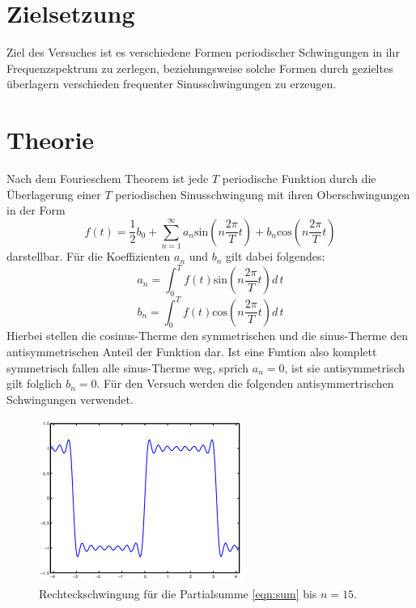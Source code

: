 \section{Zielsetzung}
\label{sec:Zielsetzung}
Ziel des Versuches ist es verschiedene Formen periodischer Schwingungen
in ihr Frequenzspektrum zu zerlegen, beziehungsweise solche Formen
durch gezieltes überlagern verschieden frequenter Sinusschwingungen
zu erzeugen.

\section{Theorie}
\label{sec:Theorie}
Nach dem Fourieschem Theorem ist jede $T$ periodische Funktion
durch die Überlagerung einer $T$ periodischen Sinusschwingung
mit ihren Oberschwingungen in der Form
\begin{equation}
  f(t) = \frac{1}{2}b_0 + \sum_{n=1}^\infty a_n \text{sin}\left(n\frac{2\pi}{T}t\right)
  + b_n\text{cos}\left(n\frac{2\pi}{T}t\right)
  \label{eqn:sum}
\end{equation}
darstellbar. Für die Koeffizienten $a_n$ und $b_n$ gilt dabei folgendes:
\begin{equation}
  a_n = \int_0^Tf(t)\text{sin}\left(n\frac{2\pi}{T}t\right)d \, t
\end{equation}
\begin{equation}
  b_n = \int_0^Tf(t)\text{cos}\left(n\frac{2\pi}{T}t\right)d \, t
\end{equation}
Hierbei stellen die cosinus-Therme den symmetrischen und die sinus-Therme den
antisymmetrischen Anteil der Funktion dar. Ist eine Funtion also komplett symmetrisch
fallen alle sinus-Therme weg, sprich $a_n = 0$, ist sie antisymmetrisch gilt folglich
$b_n = 0$. Für den Versuch werden die folgenden antisymmertrischen Schwingungen verwendet.
\begin{figure}[H]
  \centering
  \includegraphics{content/images/rechteck_theo_n=15.png}
  \caption{Rechteckschwingung für die Partialsumme \eqref{eqn:sum} bis $n=15$\cite{koeff}.}
  \label{fig:rechteck_theo}
\end{figure}
